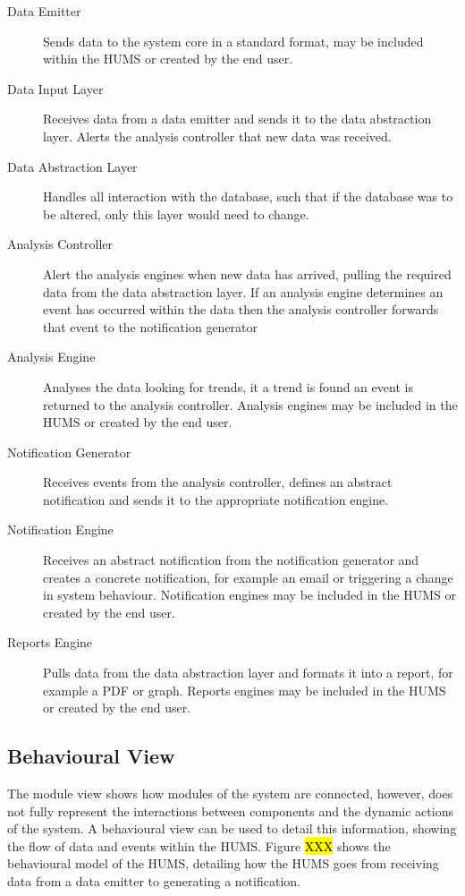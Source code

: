 \documentclass[10pt,a4paper]{article}
\begin{document}
\begin{description}
\item[Data Emitter]  Sends data to the system core in a standard format, may be included within the HUMS or created by the end user.
\item[Data Input Layer] Receives data from a data emitter and sends it to the data abstraction layer. Alerts the analysis controller that new data was received.
\item[Data Abstraction Layer] Handles all interaction with the database, such that if the database was to be altered, only this layer would need to change.
\item[Analysis Controller] Alert the analysis engines when new data has arrived, pulling the required data from the data abstraction layer. If an analysis engine determines an event has occurred within the data then the analysis controller forwards that event to the notification generator
 \item[Analysis Engine] Analyses the data looking for trends, it a trend is found an event is returned to the analysis controller. Analysis engines may be included in the HUMS or created by the end user.
 \item[Notification Generator] Receives events from the analysis controller, defines an abstract notification and sends it to the appropriate notification engine.
 \item[Notification Engine] Receives an abstract notification from the notification generator and creates a concrete notification, for example an email or triggering a change in system behaviour. Notification engines may be included in the HUMS or created by the end user.
  \item[Reports Engine] Pulls data from the data abstraction layer and formats it into a report, for example a PDF or graph. Reports engines may be included in the HUMS or created by the end user.
\end{description}

\subsection{Behavioural View}
The module view shows how modules of the system are connected, however, does not fully represent the interactions between components and the dynamic actions of the system.
A behavioural view can be used to detail this information, showing the flow of data and events within the HUMS. Figure \hl{XXX} shows the behavioural model of the HUMS, detailing how the HUMS goes from receiving data from a data emitter to generating a notification.
\end{document}
